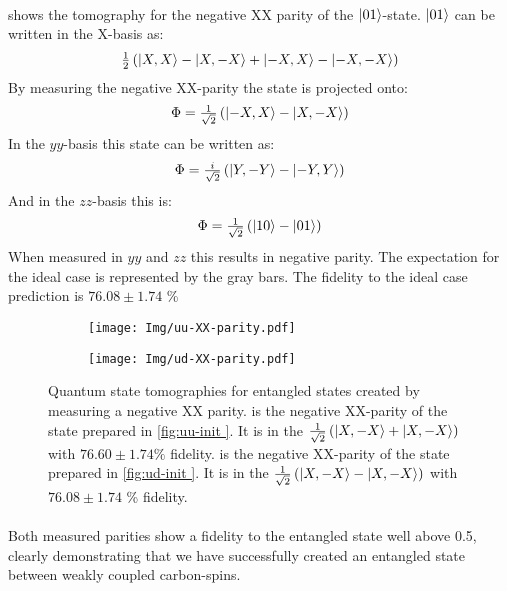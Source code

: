 \paragraph{ }
 shows the tomography for the negative XX parity of the ${\left\vert{01}\right\rangle}$-state.
${\left\vert{01}\right\rangle}$ can be written in the X-basis as:
\begin{equation}
    \tfrac{1}{2} \left( {\left\vert{X,X}\right\rangle} - {\left\vert{X,-X}\right\rangle} +{\left\vert{-X,X}\right\rangle} - {\left\vert{-X,-X}\right\rangle} \right)
 \end{equation}
By measuring the negative XX-parity the state is projected onto:
\begin{equation}
    \Phi = \tfrac{1}{\sqrt{2}} \left( {\left\vert{-X,X}\right\rangle} -{\left\vert{X,-X}\right\rangle} \right)
\end{equation}
In the $yy$-basis this state can be written as:
\begin{equation}
    \Phi = \tfrac{i}{\sqrt{2}} \left( {\left\vert{Y,-Y}\right\rangle} -{\left\vert{-Y,Y}\right\rangle} \right)
\end{equation}
And in the $zz$-basis this is:
\begin{equation}
    \Phi = \tfrac{1}{\sqrt{2}} \left( {\left\vert{10}\right\rangle} -{\left\vert{01}\right\rangle} \right)
\end{equation}
When measured in $yy$ and $zz$ this results in negative parity.
The expectation for the ideal case is represented by the gray bars.
The fidelity to the ideal case prediction is  $76.08 \pm 1.74$ \%


\begin{figure}[htbp]
    \begin{subfigure}[t]{0.49\textwidth}\centering
        \caption{}
        \texttt{[image: Img/uu-XX-parity.pdf]}
        \label{fig:uu-XX}
    \end{subfigure}
    \begin{subfigure}[t]{0.49\textwidth}\centering
        \caption{}
        \texttt{[image: Img/ud-XX-parity.pdf]}
        \label{fig:ud-XX}
    \end{subfigure}
    \caption{ Quantum state tomographies for entangled states created by measuring a negative XX parity.
     is the negative XX-parity of the state prepared in \cref{fig:uu-init }. It is in the $    \tfrac{1}{\sqrt{2}} \left( {\left\vert{X,-X}\right\rangle} +{\left\vert{X,-X}\right\rangle} \right)
$ with  $76.60 \pm 1.74\%$ fidelity.
     is the negative XX-parity of the state prepared in \cref{fig:ud-init }. It is in the $\tfrac{1}{\sqrt{2}} \left( {\left\vert{X,-X}\right\rangle} -{\left\vert{X,-X}\right\rangle} \right)$  with  $76.08 \pm 1.74$ \% fidelity.
    }
    \label{fig:2qubit_parity_Tomos}
\end{figure}

\paragraph{ }
Both measured parities show a fidelity to the entangled state well above 0.5, clearly demonstrating that we have successfully created an entangled state between weakly coupled carbon-spins.

